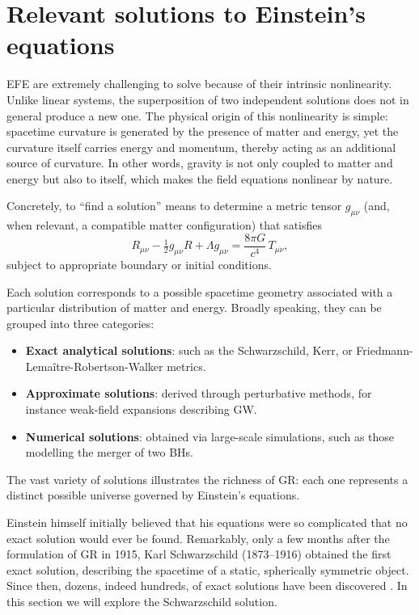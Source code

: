 \section{Relevant solutions to Einstein’s equations}
\label{solutionseinsteinequations}

EFE are extremely challenging to solve because of their intrinsic nonlinearity. Unlike linear systems, the superposition of two independent solutions does not in general produce a new one. The physical origin of this nonlinearity is simple: spacetime curvature is generated by the presence of matter and energy, yet the curvature itself carries energy and momentum, thereby acting as an additional source of curvature. In other words, gravity is not only coupled to matter and energy but also to itself, which makes the field equations nonlinear by nature.

Concretely, to “find a solution” means to determine a metric tensor $g_{\mu\nu}$ (and, when relevant, a compatible matter configuration) that satisfies
\begin{equation}
R_{\mu\nu}-\tfrac{1}{2}g_{\mu\nu}R+\Lambda g_{\mu\nu}=\frac{8\pi G}{c^{4}}\,T_{\mu\nu},
\label{einsteinequationslambda_general}
\end{equation}
subject to appropriate boundary or initial conditions.

Each solution corresponds to a possible spacetime geometry associated with a particular distribution of matter and energy. Broadly speaking, they can be grouped into three categories: 
\begin{itemize}
    \item \textbf{Exact analytical solutions}: such as the Schwarzschild, Kerr, or Friedmann-Lemaître-Robertson-Walker metrics. 
    \item \textbf{Approximate solutions}: derived through perturbative methods, for instance weak-field expansions describing GW.  
    \item \textbf{Numerical solutions}: obtained via large-scale simulations, such as those modelling the merger of two BHs.  
\end{itemize}

The vast variety of solutions illustrates the richness of GR: each one represents a distinct possible universe governed by Einstein’s equations.

Einstein himself initially believed that his equations were so complicated that no exact solution would ever be found. Remarkably, only a few months after the formulation of GR in 1915, Karl Schwarzschild (1873--1916) obtained the first exact solution, describing the spacetime of a static, spherically symmetric object. Since then, dozens, indeed hundreds, of exact solutions have been discovered \cite{LlibreBertJanssen}. In this section we will explore the Schwarzschild solution.



